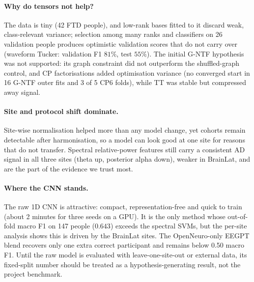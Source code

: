 \documentclass[10pt,twocolumn,a4paper]{article}
\begin{document}
\paragraph{Why do tensors not help?} The data is tiny (42 FTD people), and low-rank bases fitted to it discard weak, class-relevant variance; selection among many ranks and classifiers on 26 validation people produces optimistic validation scores that do not carry over (waveform Tucker: validation F1 $81\%$, test $55\%$). The initial G-NTF hypothesis was not supported: its graph constraint did not outperform the shuffled-graph control, and CP factorisations added optimisation variance (no converged start in 16 G-NTF outer fits and 3 of 5 CP6 folds), while TT was stable but compressed away signal.

\paragraph{Site and protocol shift dominate.} Site-wise normalisation helped more than any model change, yet cohorts remain detectable after harmonisation, so a model can look good at one site for reasons that do not transfer. Spectral relative-power features still carry a consistent AD signal in all three sites (theta up, posterior alpha down), weaker in BrainLat, and are the part of the evidence we trust most.

\paragraph{Where the CNN stands.} The raw 1D CNN is attractive: compact, representation-free and quick to train (about 2 minutes for three seeds on a GPU). It is the only method whose out-of-fold macro F1 on 147 people ($0.643$) exceeds the spectral SVMs, but the per-site analysis shows this is driven by the BrainLat sites. The OpenNeuro-only EEGPT blend recovers only one extra correct participant and remains below 0.50 macro F1. Until the raw model is evaluated with leave-one-site-out or external data, its fixed-split number should be treated as a hypothesis-generating result, not the project benchmark.

\end{document}
